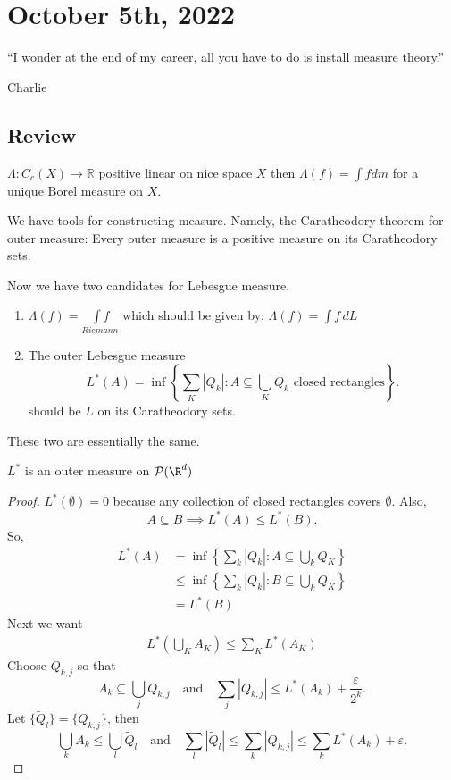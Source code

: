 \section{October 5th, 2022}

\epigraph{``I wonder at the end of my career, all you have to do is install measure theory.''}{Charlie}

\subsection*{Review}

\begin{theorem}[Riesz]
  $\Lambda : C_c (X) \to \mathbb{R}$ positive linear on nice space $X$ then $\Lambda(f) = \int f dm$ for a unique Borel measure on $X$.
\end{theorem}

We have tools for constructing measure. Namely, the Caratheodory theorem for outer measure: Every outer measure is a positive measure on its Caratheodory sets.

Now we have two candidates for Lebesgue measure.

\begin{enumerate}
	\item $\Lambda (f) = \underset{Riemann}{\int f}$
		which should be given by: $\Lambda(f) = \int f \,dL$
	\item The outer Lebesgue measure \[
		L^* (A) = \inf \left\{\sum_K |Q_k| : A \subseteq \bigcup_{K} Q_k \text{ closed rectangles}\right\}.
	\]
  should be $L$ on its Caratheodory sets.
\end{enumerate}

These two are essentially the same.

\begin{lemma}
	$L^*$ is an outer measure on $\mathcal{P}(\R^d)$
\end{lemma}

\begin{proof}
	$L^* (\emptyset)= 0$ because any collection of closed rectangles covers $\emptyset$. Also,
  \[
		A \subseteq B \implies L^*(A) \leq L^*(B).
  \]
  So,
	 \begin{align*}
	L^*(A) & = \inf \left\{\sum_{k} |Q_k| : A \subseteq \bigcup_{k} Q_K \right\} \\
         & \leq \inf\left\{\sum_{k} |Q_k| : B \subseteq \bigcup_{k} Q_K \right\} \\
         & = L^*(B)
	\end{align*}
	Next we want
	\begin{align*}
	L^* \left( \bigcup_{K} A_K \right) \leq \sum_{K} L^* (A_K)
	\end{align*}
	Choose $Q_{k,j}$ so that
	\[
		A_k \subseteq \bigcup_{j} Q_{k,j} \quad \text{and} \quad \sum_{j} | Q_{k,j} | \leq L^* (A_{k}) + \frac{\varepsilon}{2^{k}}.
	\]
	Let $\{\tilde{Q}_{l}\} = \{Q_{k,j}\}$, then
	\[
		\bigcup_{k}A_{k} \leq \bigcup_{l} \tilde{Q}_{l} \quad \text{and} \quad
		\sum_{l} | \tilde{Q}_{l} | \leq \sum_{k} |Q_{k,j} | \leq \sum_{k} L^* (A_k) + \varepsilon.
	\]
\end{proof}

